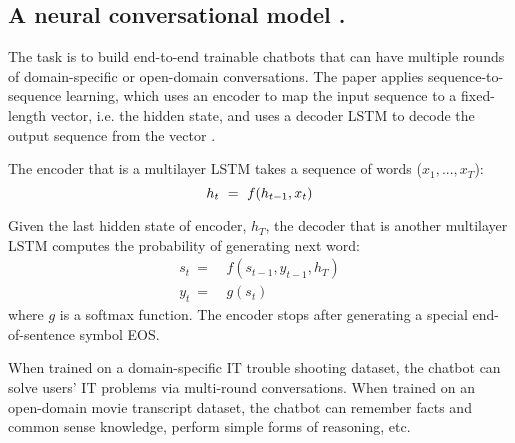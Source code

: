 \subsection{A neural conversational model \cite{Vinyals2015A}.}

The task is to build end-to-end trainable chatbots that can have multiple rounds of domain-specific or open-domain conversations. The paper applies sequence-to-sequence learning, which uses an encoder to map the input sequence to a fixed-length vector, i.e. the hidden state, and uses a decoder LSTM to decode the output sequence from the vector \cite{Sutskever2014Sequence}.

The encoder that is a multilayer LSTM takes a sequence of words ($x_{1},...,x_{T}$):
\begin{equation}
h_{t} \ = \ f( h_{t-1}, x_{t} ) \\
\end{equation}

Given the last hidden state of encoder, $h_{T}$, the decoder that is another multilayer LSTM computes the probability of generating next word:
\begin{equation}
\begin{aligned}
s_{t} \ =& \ f( s_{t-1}, y_{t-1}, h_{T} ) \\
y_{t} \ =& \ g( s_{t} )
\end{aligned}
\end{equation}
where $g$ is a softmax function. The encoder stops after generating a special end-of-sentence symbol EOS.

When trained on a domain-specific IT trouble shooting dataset, the chatbot can solve users' IT problems via multi-round conversations. When trained on an open-domain movie transcript dataset, the chatbot can remember facts and common sense knowledge, perform simple forms of reasoning, etc. 